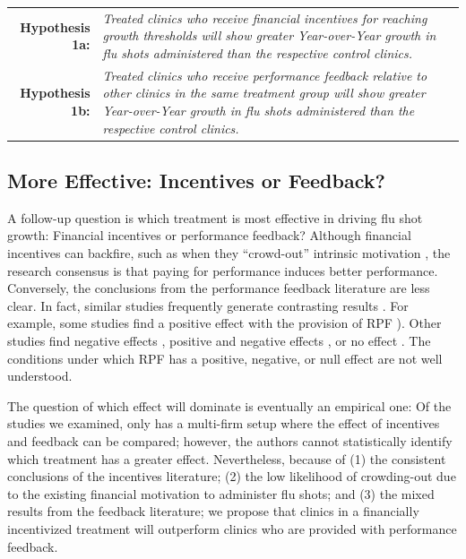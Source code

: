  \medskip \noindent
 \begin{tabularx} {\linewidth}{ r X }
    \textbf{Hypothesis 1a:} & \textit{Treated clinics who receive financial incentives for reaching growth thresholds will show greater Year-over-Year growth in flu shots administered than the respective control clinics.} \\
    \textbf{Hypothesis 1b:} & \textit{Treated clinics who receive performance feedback relative to other clinics in the same treatment group will show greater Year-over-Year growth in flu shots administered than the respective control clinics.}
 \end{tabularx}   %
 
 \subsection{More Effective: Incentives or Feedback?}
 A follow-up question is which treatment is most effective in driving flu shot growth: Financial incentives or performance feedback? Although financial incentives can backfire, such as when they “crowd-out” intrinsic motivation \citep[e.g.,][]{Deci1971,Fehr2000,Gneezy2011,Staats2017,Lazear2018}, the research consensus is that paying for performance induces better performance. Conversely, the conclusions from the performance feedback literature are less clear. In fact, similar studies frequently generate contrasting results \citep[as discussed in][]{Dechenaux2015}. For example, some studies find a positive effect with the provision of RPF \citep[e.g.,][]{Casas-Arce2009,Azmat2010,Blanes-i-Vidal2011,Delfgaauw2013,Song2018a}). Other studies find negative effects \citep[e.g.,][]{Barankay2012,Bandiera2013,Ashraf2014}, positive and negative effects \citep[e.g.,][]{Blader2016}, or no effect \citep[e.g.,][]{Delfgaauw2014}. The conditions under which RPF has a positive, negative, or null effect are not well understood.
 
 The question of which effect will dominate is eventually an empirical one: Of the studies we examined, only \cite{Delfgaauw2013} has a multi-firm setup where the effect of incentives and feedback can be compared; however, the authors cannot statistically identify which treatment has a greater effect. Nevertheless, because of (1) the consistent conclusions of the incentives literature; (2) the low likelihood of crowding-out due to the existing financial motivation to administer flu shots; and (3) the mixed results from the feedback literature; we propose that clinics in a financially incentivized treatment will outperform clinics who are provided with performance feedback.
 
